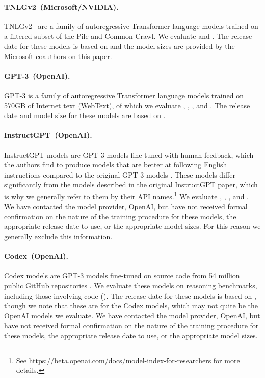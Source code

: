 \paragraph{TNLGv2~(Microsoft/NVIDIA).}
TNLGv2~\citep{smith2022mtnlg} are a family of autoregressive Transformer language models trained on a filtered subset of the Pile \citep{gao2021thepile} and Common Crawl.
We evaluate \mtnlgseven and \mtnlgfivethreezero.
The release date for these models is based on \citet{smith2022mtnlg} and the model sizes are provided by the Microsoft coauthors on this paper. 

\paragraph{GPT-3~(OpenAI).} GPT-3 \citep{brown2020gpt3} is a family of autoregressive Transformer language models trained on 570GB of Internet text (WebText), of which we evaluate \gptada, \gptbabbage, \gptcurie, and \gptdavinci.
The release date and model size for these models are based on \citet{brown2020gpt3}.

\paragraph{InstructGPT~(OpenAI).} 
InstructGPT models are GPT-3 models fine-tuned with human feedback, which the authors find to produce models that are better at following English instructions compared to the original GPT-3 models \citep{ouyang2022instructions}.
These models differ significantly from the models described in the original InstructGPT paper, which is why we generally refer to them by their API names.\footnote{See \url{https://beta.openai.com/docs/model-index-for-researchers} for more details.}
We evaluate \instructada, \instructbabbage, \instructcurie, and \instructdavinci. 
We have contacted the model provider, OpenAI, but have not received formal confirmation on the nature of the training procedure for these models, the appropriate release date to use, or the appropriate model sizes.
For this reason we generally exclude this information.

\paragraph{Codex~(OpenAI).} Codex models are GPT-3 models fine-tuned on source code from 54 million public GitHub repositories \citep{chen2021codex}. 
We evaluate these models on reasoning benchmarks, including those involving code ().
The release date for these models is based on \citet{chen2021codex}, though we note that these are for the Codex models, which may not quite be the OpenAI models we evaluate.
We have contacted the model provider, OpenAI, but have not received formal confirmation on the nature of the training procedure for these models, the appropriate release date to use, or the appropriate model sizes.

